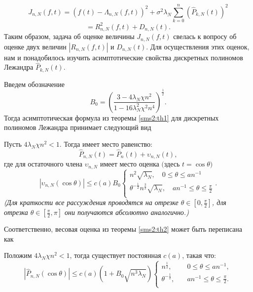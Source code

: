 \begin{equation*}
J_{n, N} (f, t) = \left( f(t) - \Lambda_{n,N}(f,t)\right)^2 + \sigma^2\lambda_N\sum\limits_{k=0}^{n} \left(\hat{P}_{k,N}(t)\right)^2
\end{equation*}
\begin{equation}
\label{SMS2.problem}
= R^2_{n,N}(f,t) + D_{n,N}(t).
\end{equation}
Таким образом, задача об оценке величины $J_{n,N}(f,t)$ свелась к вопросу об оценке двух величин $\left| R_{n,N}(f,t)\right|$ и $D_{n,N}(t)$.
Для осуществления этих оценок, нам и понадобилось изучить асимптотические свойства дискретных полиномов Лежандра $\hat{P}_{k,N}(t)$.

\noindent Введем обозначение
\begin{equation*}
B_0 = \left( \frac{3-4\lambda_N \chi n^2}{1-16 \lambda_N^2 \chi^2 n^4} \right)^{\frac{1}{2}}.
\end{equation*}
Тогда асимптотическая формула из теоремы \ref{sms2:th1} для дискретных полиномов Лежандра принимает следующий вид

\begin{theorem}
\label{sms2:thA}
Пусть $4\lambda_N \chi n^2 < 1$. Тогда имеет место равенство:
\begin{equation*}
\hat{P}_{n,N}(t) = \hat{P}_{n}(t) + \upsilon_{n,N}(t),
\end{equation*}
где для остаточного члена $\upsilon_{n,N}$ имеет место оценка $($здесь $t=\cos\theta)$
\begin{equation*}
\left|\upsilon_{n,N}(\cos{\theta})\right| \leq
c(a) B_0
\left\{
\begin{aligned}
n^{2}\sqrt{\lambda_N},\quad 0\leq\theta\leq a n^{-1}\\
\theta^{-\frac{1}{2}}n^{\frac{3}{2}}\sqrt{\lambda_N},\quad a n^{-1}\leq\theta\leq \frac{\pi}{2}\\
\end{aligned}
\right. .
\end{equation*}
\textit{(Для краткости все рассуждения проводятся на отрезке $\theta \in \left[ 0,\frac{\pi}{2}\right]$, для отрезка $\theta \in \left[ \frac{\pi}{2}, \pi\right]$ они получаются абсолютно аналогично.)}
\end{theorem}


\noindent Соответственно, весовая оценка из теоремы \ref{sms2:th2} может быть переписана как 

\begin{theorem}
\label{sms2:thB}
Положим $4\lambda_N \chi n^2 < 1$, тогда существует постоянная $c(a)$, такая что:
\begin{equation}
\label{sms2.weightestim}
\left|\hat{P}_{n,N}(\cos{\theta})\right| \leq
c(a) \left(1 + B_0\sqrt{n^{3}\lambda_N}\right)
\left\{
\begin{aligned}
n^{\frac12},& \quad 0\leq \theta \leq an^{-1},\\
\theta^{-\frac12},& \quad an^{-1}\leq \theta \leq \frac{\pi}{2}.\\
\end{aligned}
\right.
\end{equation}
\end{theorem}


